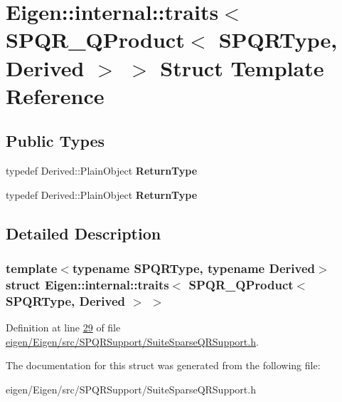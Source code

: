 \hypertarget{struct_eigen_1_1internal_1_1traits_3_01_s_p_q_r___q_product_3_01_s_p_q_r_type_00_01_derived_01_4_01_4}{}\section{Eigen\+:\+:internal\+:\+:traits$<$ S\+P\+Q\+R\+\_\+\+Q\+Product$<$ S\+P\+Q\+R\+Type, Derived $>$ $>$ Struct Template Reference}
\label{struct_eigen_1_1internal_1_1traits_3_01_s_p_q_r___q_product_3_01_s_p_q_r_type_00_01_derived_01_4_01_4}
\subsection*{Public Types}
\begin{DoxyCompactItemize}
\item 
\mbox{\label{struct_eigen_1_1internal_1_1traits_3_01_s_p_q_r___q_product_3_01_s_p_q_r_type_00_01_derived_01_4_01_4_ab2bb8a51d34349489fc6ac9d15dda5e0}} 
typedef Derived\+::\+Plain\+Object {\bfseries Return\+Type}
\item 
\mbox{\label{struct_eigen_1_1internal_1_1traits_3_01_s_p_q_r___q_product_3_01_s_p_q_r_type_00_01_derived_01_4_01_4_ab2bb8a51d34349489fc6ac9d15dda5e0}} 
typedef Derived\+::\+Plain\+Object {\bfseries Return\+Type}
\end{DoxyCompactItemize}


\subsection{Detailed Description}
\subsubsection*{template$<$typename S\+P\+Q\+R\+Type, typename Derived$>$\newline
struct Eigen\+::internal\+::traits$<$ S\+P\+Q\+R\+\_\+\+Q\+Product$<$ S\+P\+Q\+R\+Type, Derived $>$ $>$}



Definition at line \hyperlink{eigen_2_eigen_2src_2_s_p_q_r_support_2_suite_sparse_q_r_support_8h_source_l00029}{29} of file \hyperlink{eigen_2_eigen_2src_2_s_p_q_r_support_2_suite_sparse_q_r_support_8h_source}{eigen/\+Eigen/src/\+S\+P\+Q\+R\+Support/\+Suite\+Sparse\+Q\+R\+Support.\+h}.



The documentation for this struct was generated from the following file\+:\begin{DoxyCompactItemize}
\item 
eigen/\+Eigen/src/\+S\+P\+Q\+R\+Support/\+Suite\+Sparse\+Q\+R\+Support.\+h\end{DoxyCompactItemize}
